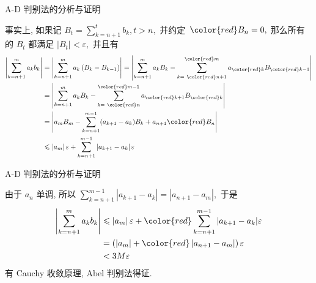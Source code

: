 
\begin{frame}{A-D 判别法的分析与证明}

事实上, 如果记 $B_t = \sum\limits_{k=n+1}^{t} b_k, t > n,$ 并约定~${\color{red}B_n = 0},$ 那么所有的 $B_t$ 都满足 $\lvert B_t \rvert < \varepsilon,$ 并且有
{\smaller[1]
\begin{align*}
\left\lvert \sum\limits_{k=n+1}^{m} a_k b_k \right\rvert & = \left\lvert \sum\limits_{k=n+1}^{m} a_k \left( B_{k} - B_{k-1} \right) \right\rvert = \left\lvert \sum\limits_{k=n+1}^{m} a_k B_{k} - \sum\limits_{k = ~ {\color{red}n+1}}^{{\color{red}m}} a_{{\color{red}k}} B_{{\color{red}k-1}} \right\rvert \\
& = \left\lvert \sum\limits_{k=n+1}^{m} a_k B_{k} - \sum\limits_{k = ~ {\color{red}n}}^{{\color{red}m-1}} a_{{\color{red}k+1}} B_{{\color{red}k}} \right\rvert \\
& = \left\lvert a_mB_m - \sum\limits_{k=n+1}^{m-1} (a_{k+1} - a_k) B_{k} + a_{n+1}{\color{red}B_n} \right\rvert \\
& \leqslant \left\lvert a_m \right\rvert \varepsilon + \sum\limits_{k=n+1}^{m-1} \left\lvert a_{k+1} - a_k \right\rvert \varepsilon
\end{align*}
}

\end{frame}


\begin{frame}{A-D 判别法的分析与证明}

由于 $a_n$ 单调, 所以 $\sum\limits_{k=n+1}^{m-1} \left\lvert a_{k+1} - a_k \right\rvert = \left\lvert a_{n+1} - a_{m} \right\rvert,$ 于是
\begin{align*}
\left\lvert \sum\limits_{k=n+1}^{m} a_k b_k \right\rvert & \leqslant \left\lvert a_m \right\rvert \varepsilon + {\color{red} \sum\limits_{k=n+1}^{m-1} \left\lvert a_{k+1} - a_k \right\rvert} \varepsilon \\
& = \left( \left\lvert a_m \right\rvert + {\color{red} \left\lvert a_{n+1} - a_{m} \right\rvert} \right) \varepsilon \\
& < 3M\varepsilon
\end{align*}
\pause
有 Cauchy 收敛原理, Abel 判别法得证.

\end{frame}


